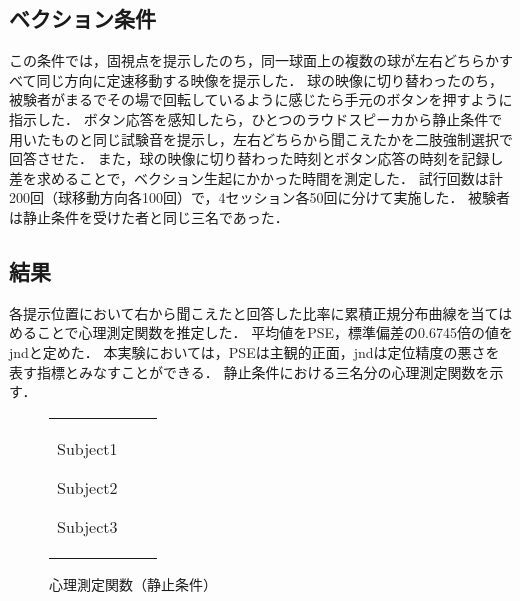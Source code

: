 \documentclass[12pt,a4j]{jsarticle}
\renewcommand{\ }{\hspace{1zw}}
\begin{document}
\subsection{ベクション条件}
この条件では，固視点を提示したのち，同一球面上の複数の球が左右どちらかすべて同じ方向に定速移動する映像を提示した．
球の映像に切り替わったのち，被験者がまるでその場で回転しているように感じたら手元のボタンを押すように指示した．
ボタン応答を感知したら，ひとつのラウドスピーカから静止条件で用いたものと同じ試験音を提示し，左右どちらから聞こえたかを二肢強制選択で回答させた．
また，球の映像に切り替わった時刻とボタン応答の時刻を記録し差を求めることで，ベクション生起にかかった時間を測定した．
試行回数は計200回（球移動方向各100回）で，4セッション各50回に分けて実施した．
被験者は静止条件を受けた者と同じ三名であった．

\subsection{結果}
各提示位置において右から聞こえたと回答した比率に累積正規分布曲線を当てはめることで心理測定関数を推定した．
平均値をPSE，標準偏差の0.6745倍の値をjndと定めた．
本実験においては，PSEは主観的正面，jndは定位精度の悪さを表す指標とみなすことができる．
静止条件における三名分の心理測定関数を示す．\\
\begin{figure}[htbp]
    \centering
    \begin{tabular}{ccc}
        \begin{minipage}{0.33\columnwidth}
            \centering
            Subject1
        \end{minipage}
        \begin{minipage}{0.33\columnwidth}
            \centering
            Subject2
        \end{minipage}
        \begin{minipage}{0.33\columnwidth}
            \centering
            Subject3
        \end{minipage}
    \end{tabular}
    \caption{心理測定関数（静止条件）}
    \label{pf_s}
\end{figure}
\end{document}
